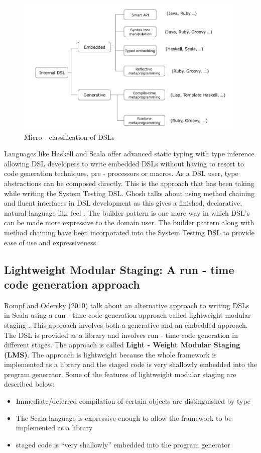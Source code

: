 \documentclass[12pt]{article}
\begin{document}
\begin{figure}[H]
  \centering
    \includegraphics[height=250px]{figures/classification.png}
  \caption{Micro - classification of DSLs}
\end{figure}

\noindent
Languages like Haskell and Scala offer advanced static typing with type inference allowing DSL developers to write embedded DSLs without having to resort to code generation techniques, pre - processors or macros. As a DSL user, type abstractions can be composed directly. This is the approach that has been taking while writing the System Testing DSL. Ghosh talks about using method chaining and fluent interfaces in DSL development as this gives a finished, declarative, natural language like feel \cite{fluentInterface}. The builder pattern is one more way in which DSL's can be made more expressive to the domain user. The builder pattern along with method chaining have been incorporated into the System Testing DSL to provide ease of use and expressiveness.

\subsection{Lightweight Modular Staging: A run - time code generation approach}
Rompf and Odersky (2010) talk about an alternative approach to writing DSLs in Scala using a run - time code generation approach called lightweight modular staging \cite{lms}. This approach involves both a generative and an embedded approach. The DSL is provided as a library and involves run - time code generation in different stages. The approach is called \textbf{Light - Weight Modular Staging (LMS)}. The approach is lightweight because the whole framework is implemented as a library and the staged code is very shallowly embedded into the program generator. Some of the features of lightweight modular staging are described below:
\begin{itemize}
\item Immediate/deferred compilation of certain objects are distinguished by type
\item The Scala language is expressive enough to allow the framework to be implemented as a library
\item staged code is “very shallowly” embedded into the program generator
\end{itemize}
\bigskip
\end{document}
